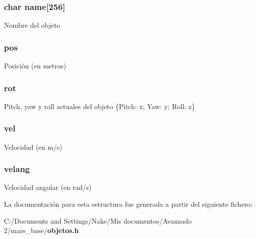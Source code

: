 \subsubsection[{name}]{\setlength{\rightskip}{0pt plus 5cm}char {\bf name}[256]}\label{structt__obj__base_a8e03167ce04350be901b028cc4cf1ce1}
Nombre del objeto 
\subsubsection[{pos}]{ {\bf pos}}\label{structt__obj__base_a973f240c50caa6c6c6857e217853d193}
Posición (en metros) 
\subsubsection[{rot}]{ {\bf rot}}\label{structt__obj__base_af9816f15b9da8a8a09b7afa3f0fe9c7e}
Pitch, yaw y roll actuales del objeto \{Pitch: x; Yaw: y; Roll: z\} 
\subsubsection[{vel}]{ {\bf vel}}\label{structt__obj__base_a80773f7b73e38fc1936f65e8b102af4d}
Velocidad (en m/s) 
\subsubsection[{velang}]{ {\bf velang}}\label{structt__obj__base_a1386555347bbe012a0440a4ba9578318}
Velocidad angular (en rad/s) 

La documentación para esta estructura fue generada a partir del siguiente fichero:\begin{DoxyCompactItemize}
\item 
C:/Documents and Settings/Nake/Mis documentos/Avanzado 2/mars\_\-base/{\bf objetos.h}\end{DoxyCompactItemize}
